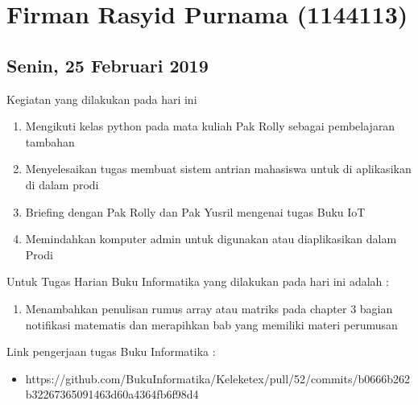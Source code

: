 \chapter{Firman Rasyid Purnama (1144113)}

\section{Senin, 25 Februari 2019}
Kegiatan yang dilakukan pada hari ini
\begin{enumerate}
\item Mengikuti kelas python pada mata kuliah Pak Rolly sebagai pembelajaran tambahan
\item Menyelesaikan tugas membuat sistem antrian mahasiswa untuk di aplikasikan di dalam prodi
\item Briefing dengan Pak Rolly dan Pak Yusril mengenai tugas Buku IoT
\item Memindahkan komputer admin untuk digunakan atau diaplikasikan dalam Prodi
\end{enumerate}

Untuk Tugas Harian Buku Informatika yang dilakukan pada hari ini adalah :
\begin{enumerate}
\item Menambahkan penulisan rumus array atau matriks pada chapter 3 bagian notifikasi matematis dan merapihkan bab yang memiliki materi perumusan
\end{enumerate}

Link pengerjaan tugas Buku Informatika :
\begin{itemize}
\item https://github.com/BukuInformatika/Keleketex/pull/52/commits/b0666b262b32267365091463d60a4364fb6f98d4
\end{itemize}